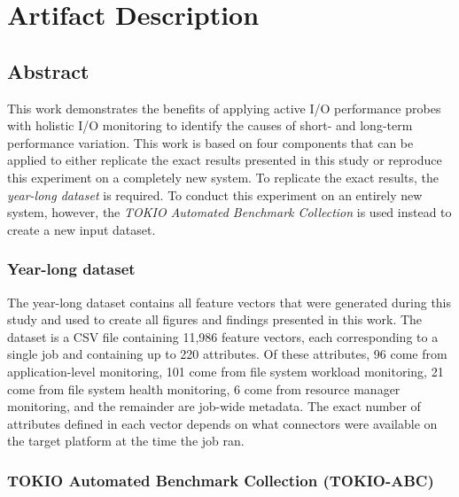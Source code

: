 \appendix

\section{Artifact Description} \label{sec:appendix/artifacts}

\subsection{Abstract}

This work demonstrates the benefits of applying active I/O performance probes with holistic I/O monitoring to identify the causes of short- and long-term performance variation.
This work is based on four components that can be applied to either replicate the exact results presented in this study or reproduce this experiment on a completely new system.
To replicate the exact results, the \emph{year-long dataset} is required.
To conduct this experiment on an entirely new system, however, the \emph{TOKIO Automated Benchmark Collection} is used instead to create a new input dataset.

\subsubsection{Year-long dataset}

The year-long dataset contains all feature vectors that were generated during this study and used to create all figures and findings presented in this work.
The dataset is a CSV file containing 11,986 feature vectors, each corresponding to a single job and containing up to 220 attributes.
Of these attributes, 96 come from application-level monitoring, 101 come from file system workload monitoring, 21 come from file system health monitoring, 6 come from resource manager monitoring, and the remainder are job-wide metadata.
The exact number of attributes defined in each
vector depends on what connectors were available on the target platform at the time the job ran.


\subsubsection{TOKIO Automated Benchmark Collection (TOKIO-ABC)}

